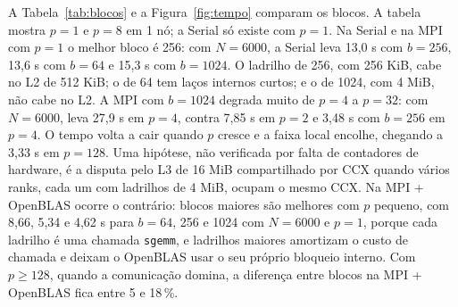 \documentclass[Portugues]{ic-tese-v3}
\DeclareRobustCommand{\_}{\textunderscore\allowbreak} %
\begin{document}
\FloatBarrier
A Tabela~\ref{tab:blocos} e a Figura~\ref{fig:tempo} comparam os blocos. A tabela mostra $p=1$ e $p=8$ em 1 nó; a Serial só existe com $p=1$. Na Serial e na MPI com $p=1$ o melhor bloco é 256: com $N=6000$, a Serial leva 13,0 s com $b=256$, 13,6 s com $b=64$ e 15,3 s com $b=1024$. O ladrilho de 256, com 256 KiB, cabe no L2 de 512 KiB; o de 64 tem laços internos curtos; e o de 1024, com 4 MiB, não cabe no L2. A MPI com $b=1024$ degrada muito de $p=4$ a $p=32$: com $N=6000$, leva 27,9 s em $p=4$, contra 7,85 s em $p=2$ e 3,48 s com $b=256$ em $p=4$. O tempo volta a cair quando $p$ cresce e a faixa local encolhe, chegando a 3,33 s em $p=128$. Uma hipótese, não verificada por falta de contadores de hardware, é a disputa pelo L3 de 16 MiB compartilhado por CCX quando vários ranks, cada um com ladrilhos de 4 MiB, ocupam o mesmo CCX. Na MPI + OpenBLAS ocorre o contrário: blocos maiores são melhores com $p$ pequeno, com 8,66, 5,34 e 4,62 s para $b=64$, 256 e 1024 com $N=6000$ e $p=1$, porque cada ladrilho é uma chamada \texttt{sgemm}, e ladrilhos maiores amortizam o custo de chamada e deixam o OpenBLAS usar o seu próprio bloqueio interno. Com $p\ge128$, quando a comunicação domina, a diferença entre blocos na MPI + OpenBLAS fica entre 5 e 18\,\%.
\end{document}
